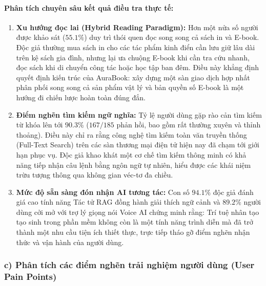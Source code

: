 \documentclass[11pt, a4paper]{report}
\begin{document}
\paragraph{Phân tích chuyên sâu kết quả điều tra thực tế:}
\begin{enumerate}
    \item \textbf{Xu hướng đọc lai (Hybrid Reading Paradigm):} Hơn một nửa số người được khảo sát ($55.1\%$) duy trì thói quen đọc song song cả sách in và E-book. Độc giả thường mua sách in cho các tác phẩm kinh điển cần lưu giữ lâu dài trên kệ sách gia đình, nhưng lại ưa chuộng E-book khi cần tra cứu nhanh, đọc sách khi di chuyển công tác hoặc học tập ban đêm. Điều này khẳng định quyết định kiến trúc của AuraBook: xây dựng một sàn giao dịch hợp nhất phân phối song song cả sản phẩm vật lý và bản quyền số E-book là một hướng đi chiến lược hoàn toàn đúng đắn.
    \item \textbf{Điểm nghẽn tìm kiếm ngữ nghĩa:} Tỷ lệ người dùng gặp rào cản tìm kiếm từ khóa lên tới $90.3\%$ ($167/185$ phản hồi, bao gồm rất thường xuyên và thỉnh thoảng). Điều này chỉ ra rằng công nghệ tìm kiếm toàn văn truyền thống (Full-Text Search) trên các sàn thương mại điện tử hiện nay đã chạm tới giới hạn phục vụ. Độc giả khao khát một cơ chế tìm kiếm thông minh có khả năng tiếp nhận câu lệnh bằng ngôn ngữ tự nhiên, hiểu được các khái niệm trừu tượng thông qua không gian véc-tơ đa chiều.
    \item \textbf{Mức độ sẵn sàng đón nhận AI tương tác:} Con số $94.1\%$ độc giả đánh giá cao tính năng Tác tử RAG đồng hành giải thích ngữ cảnh và $89.2\%$ người dùng cởi mở với trợ lý giọng nói Voice AI chứng minh rằng: Trí tuệ nhân tạo tạo sinh trong phần mềm không còn là một tính năng trình diễn mà đã trở thành một nhu cầu tiện ích thiết thực, trực tiếp tháo gỡ điểm nghẽn nhận thức và vận hành của người dùng.
\end{enumerate}

\subsubsection{c) Phân tích các điểm nghẽn trải nghiệm người dùng (User Pain Points)}
\end{document}

